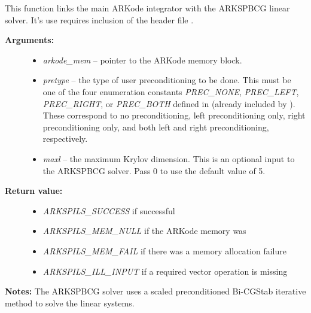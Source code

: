 \documentclass[letterpaper,10pt,english]{sphinxmanual}
\begin{document}

\begin{fulllineitems}
\label{c_interface/User_callable:ARKSpbcg}
This function links the main ARKode integrator with the ARKSPBCG
linear solver.  It's use requires inclusion of the header file
.
\begin{description}
\item[{\textbf{Arguments:}}] \leavevmode\begin{itemize}
\item {} 
\emph{arkode\_mem} -- pointer to the ARKode memory block.

\item {} 
\emph{pretype} -- the type of user preconditioning to be done.  This
must be one of the four enumeration constants \emph{PREC\_NONE},
\emph{PREC\_LEFT}, \emph{PREC\_RIGHT}, or \emph{PREC\_BOTH} defined in
  (already included by
). These correspond to no preconditioning,
left preconditioning only, right preconditioning only, and
both left and right preconditioning, respectively.

\item {} 
\emph{maxl} -- the maximum Krylov dimension. This is an optional input
to the ARKSPBCG solver. Pass 0 to use the default value of 5.

\end{itemize}

\item[{\textbf{Return value:}}] \leavevmode\begin{itemize}
\item {} 
\emph{ARKSPILS\_SUCCESS} if successful

\item {} 
\emph{ARKSPILS\_MEM\_NULL}  if the ARKode memory was 

\item {} 
\emph{ARKSPILS\_MEM\_FAIL}  if there was a memory allocation failure

\item {} 
\emph{ARKSPILS\_ILL\_INPUT} if a required vector operation is missing

\end{itemize}

\end{description}

\textbf{Notes:} The ARKSPBCG solver uses a scaled preconditioned Bi-CGStab
iterative method to solve the linear systems.

\end{fulllineitems}
\end{document}
